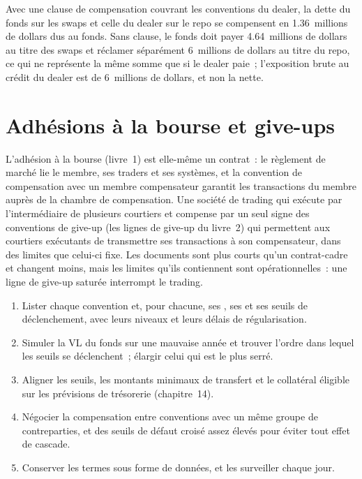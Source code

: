 Avec une clause de compensation couvrant les conventions du dealer, la dette du fonds sur les swaps et celle du dealer sur le repo se compensent en 1.36~millions de dollars dus au
fonds. Sans clause, le fonds doit payer 4.64~millions de dollars au titre des swaps et réclamer séparément 6~millions de dollars au titre du repo, ce qui ne représente la même somme
que si le dealer paie~; l'exposition brute au crédit du dealer est de 6~millions de dollars, et non la nette.

\section{Adhésions à la bourse et give-ups}

L'adhésion à la bourse (livre~1) est elle-même un contrat~: le règlement de marché lie le membre, ses traders et ses systèmes, et la convention de compensation avec un
membre compensateur garantit les transactions du membre auprès de la chambre de compensation. Une société de trading qui exécute par l'intermédiaire de plusieurs courtiers et compense par un seul signe
des conventions de give-up (les lignes de give-up du livre~2) qui permettent aux courtiers exécutants de transmettre ses transactions à son compensateur, dans des limites que celui-ci fixe. Les
documents sont plus courts qu'un contrat-cadre et changent moins, mais les limites qu'ils contiennent sont opérationnelles~: une ligne de give-up saturée interrompt le trading.

\begin{method}\label{met:fm:legal-documentation:negotiate}
\begin{enumerate}
\item Lister chaque convention et, pour chacune, ses , ses  et ses seuils de déclenchement, avec leurs niveaux et leurs délais de régularisation.
\item Simuler la VL du fonds sur une mauvaise année et trouver l'ordre dans lequel les seuils se déclenchent~; élargir celui qui est le plus serré.
\item Aligner les seuils, les montants minimaux de transfert et le collatéral éligible sur les prévisions de trésorerie (chapitre~14).
\item Négocier la compensation entre conventions avec un même groupe de contreparties, et des seuils de défaut croisé assez élevés pour éviter tout effet de cascade.
\item Conserver les termes sous forme de données, et les surveiller chaque jour.
\end{enumerate}
\end{method}

